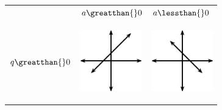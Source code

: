 \begin{center}
\label{m39338*uid82}
\noindent
{}
\tablelasttail{}
\begin{xtabular*}{\mytablewidth}[t]{|p{10\mystarwidth}|p{10\mystarwidth}|p{10\mystarwidth}|}\hline
&
    $a\greatthan{}0$
    &
    $a\lessthan{}0$
\tabularnewline{}
    $q\greatthan{}0$
    &
\setcounter{subfigure}{0}
\label{m39338*id238303}
\begin{center}
\label{m39338*id238303!!!underscore!!!media}\label{m39338*id238303!!!underscore!!!printimage}\includegraphics[width=100px]{col11306.imgs/m39338_MG10C11_006.png} %
\vspace{2pt}
\vspace{.1in}
\end{center}    
    &
\setcounter{subfigure}{0}
\label{m39338*id238315}
\begin{center}
\label{m39338*id238315!!!underscore!!!media}\label{m39338*id238315!!!underscore!!!printimage}\includegraphics[width=100px]{col11306.imgs/m39338_MG10C11_007.png} %

\end{center}
\end{xtabular*}
\end{center}

